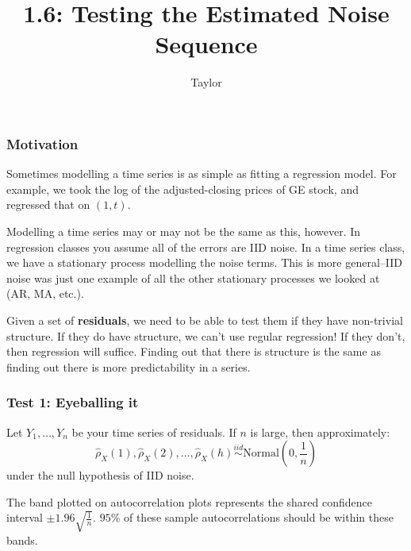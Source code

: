 \documentclass{beamer}
\title["1.6"]{1.6: Testing the Estimated Noise Sequence}
\author{Taylor}
\institute[UVA] 
{
University of Virginia \\
\medskip
\textit{} 
}
\date{}
\begin{document}

\begin{frame}
\titlepage 
\end{frame}

\begin{frame}
\frametitle{Motivation}

Sometimes modelling a time series is as simple as fitting a regression model. For example, we took the log of the adjusted-closing prices of GE stock, and regressed that on $(1, t)$. 
\newline

Modelling a time series may or may not be the same as this, however. In regression classes you assume all of the errors are IID noise. In a time series class, we have a stationary process modelling the noise terms. This is more general--IID noise was just one example of all the other stationary processes we looked at (AR, MA, etc.).
\newline

Given a set of {\bf residuals}, we need to be able to test them if they have non-trivial structure. If they do have structure, we can't use regular regression! If they don't, then regression will suffice. Finding out that there is structure is the same as finding out there is more predictability in a series.

\end{frame}



\begin{frame}
\frametitle{Test 1: Eyeballing it}

Let $Y_1, \ldots, Y_n$ be your time series of residuals. If $n$ is large, then approximately:
\[
\hat{\rho}_X(1), \hat{\rho}_X(2), \ldots, \hat{\rho}_X(h) \overset{iid}{\sim} \text{Normal}\left(0,\frac{1}{n}\right) 
\]
under the null hypothesis of IID noise.
\newline

The band plotted on autocorrelation plots represents the shared confidence interval $\pm 1.96\sqrt{\frac{1}{n}}$. $95$\% of these sample autocorrelations should be within these bands.

\end{frame}

\end{document}
